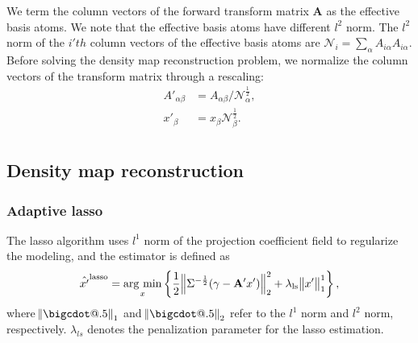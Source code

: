 \documentclass[twocolumn]{aastex62}
\makeatletter
\newcommand*\bigcdot{\mathpalette\bigcdot@{.5}}
\newcommand*\bigcdot@[2]{\mathbin{\vcenter{\hbox{\scalebox{#2}{$\m@th#1\bullet$}}}}}
\newcommand{\argmin}{\mathop{\rm arg~min}\limits}
\makeatother
\begin{document}
We term the column vectors of the forward transform matrix $\mathbf{A}$ as the
effective basis atoms. We note that the effective basis atoms have different
$l^2$ norm. The $l^2$ norm of the $i'th$ column vectors of the effective basis
atoms are $\mathcal{N}_{i}=\sum_\alpha A_{i\alpha}A_{i\alpha}$. Before solving
the density map reconstruction problem, we normalize the column vectors of the
transform matrix through a rescaling:
\begin{equation}
\begin{split}
A'_{\alpha\beta}&=A_{\alpha\beta}/\mathcal{N}_{\alpha}^{\frac{1}{2}},\\
x'_{\beta}&=x_{\beta}\mathcal{N}_{\beta}^{\frac{1}{2}}.\\
\end{split}
\end{equation}

\subsection{Density map reconstruction}
\label{subsec:method-reconstruction}

\subsubsection{Adaptive lasso}

The lasso algorithm uses $l^1$ norm of the projection coefficient field to
regularize the modeling, and the estimator is defined as
\begin{equation}
\hat{x'}^{\rm{lasso}}=\argmin_{x} \left\{ \frac{1}{2}\norm{\Sigma^{-\frac{1}{2}}(\gamma- \mathbf{A'} x')}_2^2+ \lambda_{\rm{ls}} \norm{x'}^1_1\right\},
\end{equation}
where $\norm{\bigcdot}_1$ and $\norm{\bigcdot}_2$ refer to the $l^1$ norm and
$l^2$ norm, respectively.  $\lambda_{ls}$ denotes the penalization parameter
for the lasso estimation.
\end{document}
